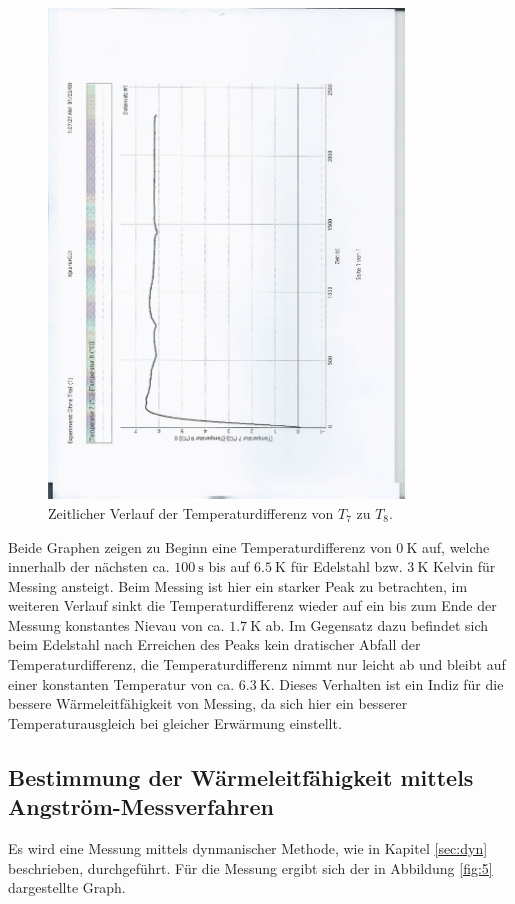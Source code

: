\begin{figure}
  \centering
  \includegraphics[height=13cm, angle=270]{scan-5.jpg}
  \caption{Zeitlicher Verlauf der Temperaturdifferenz von $T_7$ zu $T_8$.}
  \label{fig:4}
\end{figure}

Beide Graphen zeigen zu Beginn eine Temperaturdifferenz von $\SI{0}{\kelvin}$ auf, welche innerhalb der nächsten ca. $\SI{100}{\second}$ bis auf $\SI{6.5}{\kelvin}$ für Edelstahl bzw. $\SI{3}{\kelvin}$ Kelvin für Messing ansteigt.
Beim Messing ist hier ein starker Peak zu betrachten, im weiteren Verlauf sinkt die Temperaturdifferenz wieder auf ein bis zum Ende der Messung konstantes Nievau von ca. $\SI{1.7}{\kelvin}$ ab.
Im Gegensatz dazu befindet sich beim Edelstahl nach Erreichen des Peaks kein dratischer Abfall der Temperaturdifferenz, die Temperaturdifferenz nimmt nur leicht ab und bleibt auf einer konstanten Temperatur von ca. $\SI{6.3}{\kelvin}$.
Dieses Verhalten ist ein Indiz für die bessere Wärmeleitfähigkeit von Messing, da sich hier ein besserer Temperaturausgleich bei gleicher Erwärmung einstellt.

\subsection{Bestimmung der Wärmeleitfähigkeit mittels Angström-Messverfahren}
Es wird eine Messung mittels dynmanischer Methode, wie in Kapitel \ref{sec:dyn} beschrieben, durchgeführt.
Für die Messung ergibt sich der in Abbildung \ref{fig:5} dargestellte Graph.

